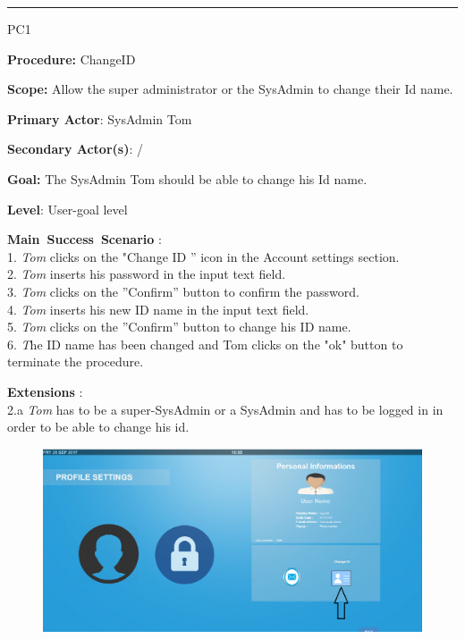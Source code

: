 \hrule
\vspace{0.5cm}
\begin{lyxlist}{PC1}
\small{
\item [\textbf{Procedure:}] ChangeID 
\item [\textbf{Scope:}] Allow the super administrator or the SysAdmin to change
their Id name.
\item [\textbf{Primary Actor}:] SysAdmin Tom
\item [\textbf{Secondary Actor(s)}:] /
\item [\textbf{Goal:}] The SysAdmin Tom should be able to change his Id name.
\item [\textbf{Level}:] User-goal level
\item [\textbf{Main~Success~Scenario}]:\\
1. \emph{Tom} clicks on the "Change ID '' icon in the Account settings
section.\\
2. \emph{Tom} inserts his password in the input text field.\\
3. \emph{Tom} clicks on the ''Confirm'' button to confirm the password.\\
4. \emph{Tom} inserts his new ID name in the input text field.\\
5. \emph{Tom} clicks on the ''Confirm'' button to change his ID name.\\
6. \emph The ID name has been changed and {Tom} clicks on the "ok" button
to terminate the procedure.\\

\item [\textbf{Extensions}]:\\
2.a \emph{Tom} has to be a super-SysAdmin or a SysAdmin and has to be logged
in in order to be able to change his id.\\
}

\begin{figure}[H]
\centering
\includegraphics[width=170mm]{images/ChangeID1.eps}
\caption{\label{overflow}}
\end{figure}


\end{lyxlist}
